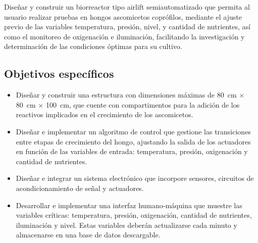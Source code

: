 Diseñar y construir un biorreactor tipo airlift semiautomatizado que permita al
usuario realizar pruebas en hongos ascomicetos coprófilos, mediante el ajuste
previo de las variables temperatura, presión, nivel, y cantidad de nutrientes, así
como el monitoreo de oxigenación e iluminación, facilitando la investigación y
determinación de las condiciones óptimas para su cultivo.

\subsection{Objetivos específicos}

\begin{itemize}
  \item Diseñar y construir una estructura con dimensiones máximas de 80~cm $\times$ 80~cm $\times$ 100~cm, que cuente con compartimentos para la adición de los reactivos implicados en el crecimiento de los ascomicetos.
  \item Diseñar e implementar un algoritmo de control que gestione las transiciones entre etapas de crecimiento del hongo, ajustando la salida de los actuadores en función de las variables de entrada: temperatura, presión, oxigenación y cantidad de nutrientes.
  \item Diseñar e integrar un sistema electrónico que incorpore sensores, circuitos de acondicionamiento de señal y actuadores.
  \item Desarrollar e implementar una interfaz humano-máquina que muestre las variables críticas: temperatura, presión, oxigenación, cantidad de nutrientes, iluminación y nivel. Estas variables deberán actualizarse cada minuto y almacenarse en una base de datos descargable.
\end{itemize}
